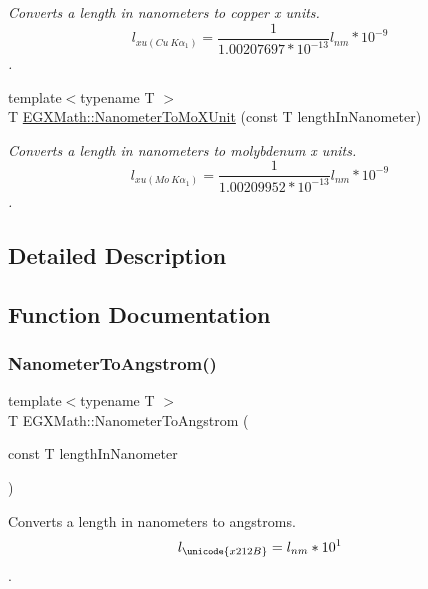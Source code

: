 \begin{DoxyCompactItemize}
\begin{DoxyCompactList}\small\item\em Converts a length in nanometers to copper x units. \[ l_{xu(Cu\ K\alpha_1)}= \frac{1}{1.00207697*10^{-13}} l_{nm} * 10^{-9}\]. \end{DoxyCompactList}\item 
{\footnotesize template$<$typename T $>$ }\\T \mbox{\hyperlink{group___e_g_x_math-_conversions-_length_conversions-_s_i-_nanometer-_non-_s_i_gacc6d7fa95c35687718c816df3c95c7b5}{E\+G\+X\+Math\+::\+Nanometer\+To\+Mo\+X\+Unit}} (const T length\+In\+Nanometer)
\begin{DoxyCompactList}\small\item\em Converts a length in nanometers to molybdenum x units. \[ l_{xu(Mo\ K\alpha_1)}=\frac{1}{1.00209952*10^{-13}} l_{nm} * 10^{-9}\]. \end{DoxyCompactList}\end{DoxyCompactItemize}


\subsection{Detailed Description}


\subsection{Function Documentation}
\mbox{\label{group___e_g_x_math-_conversions-_length_conversions-_s_i-_nanometer-_non-_s_i_ga7e2062d4cc1a422e54da597c4413efb1}} 
\subsubsection{\texorpdfstring{Nanometer\+To\+Angstrom()}{NanometerToAngstrom()}}
{\footnotesize\ttfamily template$<$typename T $>$ \\
T E\+G\+X\+Math\+::\+Nanometer\+To\+Angstrom (\begin{DoxyParamCaption}\item[{const T}]{length\+In\+Nanometer }\end{DoxyParamCaption})}



Converts a length in nanometers to angstroms. \[ l_{\unicode{x212B}}=l_{nm} * 10^{1} \]. 

